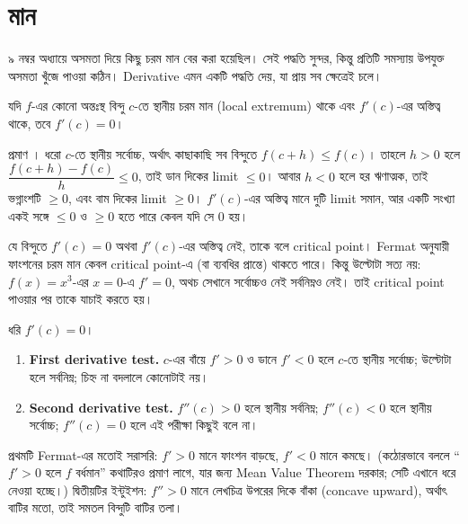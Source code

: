 \documentclass[11pt]{article}
\begin{document}
\section{ মান}

৯ নম্বর অধ্যায়ে অসমতা দিয়ে কিছু চরম মান বের করা হয়েছিল। সেই পদ্ধতি সুন্দর,
কিন্তু প্রতিটি সমস্যায় উপযুক্ত অসমতা খুঁজে পাওয়া কঠিন। Derivative এমন একটি পদ্ধতি দেয়, যা প্রায় সব ক্ষেত্রেই চলে।

\begin{idea}
যদি $f$-এর কোনো অন্তঃস্থ বিন্দু $c$-তে স্থানীয় চরম মান (local extremum) থাকে এবং
$f'(c)$-এর অস্তিত্ব থাকে, তবে $f'(c) = 0$।
\end{idea}

প্রমাণ । ধরো $c$-তে স্থানীয় সর্বোচ্চ, অর্থাৎ কাছাকাছি সব বিন্দুতে
$f(c+h) \leq f(c)$। তাহলে $h > 0$ হলে
$\dfrac{f(c+h)-f(c)}{h} \leq 0$, তাই ডান দিকের limit $\leq 0$। আবার $h < 0$
হলে হর ঋণাত্মক, তাই ভগ্নাংশটি $\geq 0$, এবং বাম দিকের limit $\geq 0$।
$f'(c)$-এর অস্তিত্ব মানে দুটি limit সমান, আর একটি সংখ্যা একই সঙ্গে $\leq 0$ ও
$\geq 0$ হতে পারে কেবল যদি সে $0$ হয়।

যে বিন্দুতে $f'(c) = 0$ অথবা $f'(c)$-এর অস্তিত্ব নেই, তাকে বলে critical point।
Fermat অনুযায়ী ফাংশনের চরম মান কেবল critical point-এ (বা ব্যবধির প্রান্তে) থাকতে পারে। 
কিন্তু উল্টোটা সত্য নয়: $f(x) = x^{3}$-এর $x=0$-এ $f' = 0$, অথচ সেখানে
সর্বোচ্চও নেই সর্বনিম্নও নেই। তাই critical point পাওয়ার পর তাকে যাচাই করতে হয়।

\begin{idea}[যাচাইয়ের দুটি পদ্ধতি]
ধরি $f'(c) = 0$।
\begin{enumerate}
  \item \textbf{First derivative test.} $c$-এর বাঁয়ে $f' > 0$ ও ডানে $f' < 0$
        হলে $c$-তে স্থানীয় সর্বোচ্চ; উল্টোটা হলে সর্বনিম্ন; চিহ্ন না বদলালে
        কোনোটাই নয়।
  \item \textbf{Second derivative test.} $f''(c) > 0$ হলে স্থানীয় সর্বনিম্ন;
        $f''(c) < 0$ হলে স্থানীয় সর্বোচ্চ; $f''(c) = 0$ হলে এই পরীক্ষা কিছুই
        বলে না।
\end{enumerate}
\end{idea}

প্রথমটি Fermat-এর মতোই সরাসরি: $f' > 0$ মানে ফাংশন বাড়ছে, $f' < 0$ মানে কমছে।
(কঠোরভাবে বললে ``$f' > 0$ হলে $f$ বর্ধমান'' কথাটিরও প্রমাণ লাগে, যার জন্য
Mean Value Theorem দরকার; সেটি এখানে ধরে নেওয়া হচ্ছে।) দ্বিতীয়টির ইন্টুইশন:
$f'' > 0$ মানে লেখচিত্র উপরের দিকে বাঁকা (concave upward), অর্থাৎ বাটির মতো,
তাই সমতল বিন্দুটি বাটির তলা।
\end{document}
